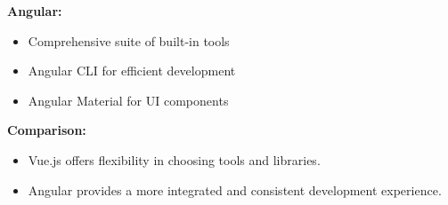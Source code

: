 \textbf{Angular:}
\begin{itemize}
    \item Comprehensive suite of built-in tools
    \item Angular CLI for efficient development
    \item Angular Material for UI components
\end{itemize}

\textbf{Comparison:}
\begin{itemize}
    \item Vue.js offers flexibility in choosing tools and libraries.
    \item Angular provides a more integrated and consistent development experience.
\end{itemize}


